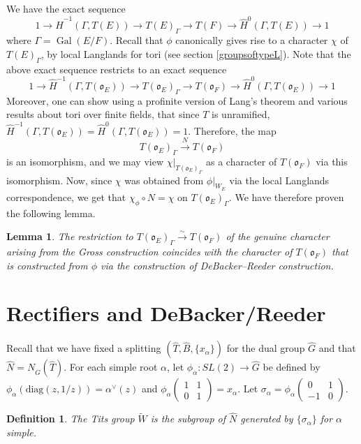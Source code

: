 \documentclass[11pt]{amsart}
\theoremstyle{plain}
\newtheorem{lemma}[enumi]{Lemma}
\newtheorem{definition}[enumi]{Definition}
\DeclareMathOperator{\Gal}{Gal}
\newcommand{\mat}[4]{\left( \begin{array}{cc} {#1} & {#2} \\ {#3} & {#4}
\end{array} \right)}
\begin{document}
We have the exact sequence $$1 \rightarrow \hat{H}^{-1}(\Gamma, T(E)) \rightarrow T(E)_{\Gamma} \rightarrow T(F) \rightarrow \hat{H}^0(\Gamma, T(E)) \rightarrow 1$$ where $\Gamma = \Gal(E/F)$.  Recall that $\phi$ canonically gives rise to a character $\chi$ of $T(E)_{\Gamma}$, by local Langlands for tori (see section \ref{groupsoftypeL}).  Note that the above exact sequence restricts to an exact sequence
$$1 \rightarrow \hat{H}^{-1}(\Gamma, T(\mathfrak{o}_E)) \rightarrow T(\mathfrak{o}_E)_{\Gamma} \rightarrow T(\mathfrak{o}_F) \rightarrow \hat{H}^0(\Gamma, T(\mathfrak{o}_E)) \rightarrow 1$$
Moreover, one can show using a profinite version of Lang's theorem and various results about tori over finite fields, that since $T$ is unramified, $\hat{H}^{-1}(\Gamma, T(\mathfrak{o}_E)) = \hat{H}^0(\Gamma, T(\mathfrak{o}_E)) = 1$.  Therefore, the map $$T(\mathfrak{o}_E)_{\Gamma} \xrightarrow{N} T(\mathfrak{o}_F)$$ is an isomorphism, and we may view $\chi|_{T(\mathfrak{o}_E)_{\Gamma}}$ as a character of $T(\mathfrak{o}_F)$ via this isomorphism.  Now, since $\chi$ was obtained from $\phi|_{W_E}$ via the local Langlands correspondence, we get that $\chi_{\phi} \circ N = \chi$ on $T(\mathfrak{o}_E)_{\Gamma}$.  We have therefore proven the following lemma.

\begin{lemma}\label{grossanddebackerreedercompatibility}
The restriction to $T(\mathfrak{o}_E)_{\Gamma} \xrightarrow{\sim} T(\mathfrak{o}_F)$ of the genuine character arising from the Gross construction coincides with the character of $T(\mathfrak{o}_F)$ that is constructed from $\phi$ via the construction of DeBacker--Reeder construction.
\end{lemma}

\section{Rectifiers and DeBacker/Reeder}\label{mainresults}

Recall that we have fixed a splitting $(\hat{T}, \hat{B}, \{x_{\alpha} \})$ for the dual group $\hat{G}$ and that $\hat{N} = N_{\hat{G}}(\hat{T})$.  For each simple root $\alpha$, let $\phi_{\alpha} : SL(2) \rightarrow \hat{G}$ be defined by $\phi_{\alpha}(\mathrm{diag}(z,1/z)) = \alpha^{\vee}(z)$ and $\phi_{\alpha}\mat{1}{1}{0}{1} = x_{\alpha}$. Let $\sigma_{\alpha} = \phi_{\alpha}\mat{0}{1}{-1}{0}$.

\begin{definition}
The Tits group $\widetilde{W}$ is the subgroup of $\hat{N}$ generated by $\{\sigma_{\alpha} \}$ for $\alpha$ simple.
\end{definition}
\end{document}
